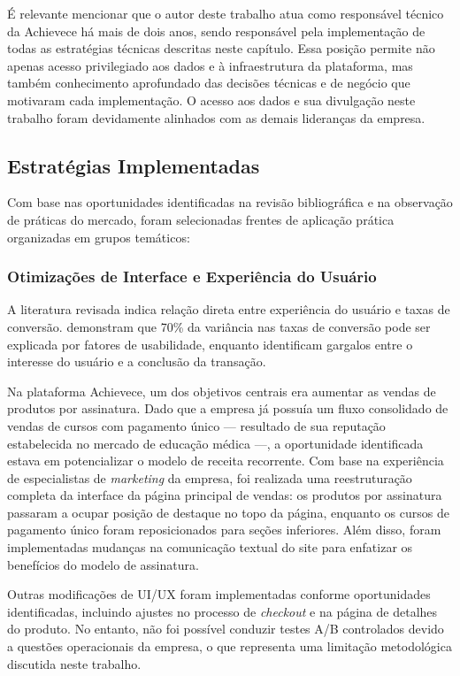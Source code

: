 É relevante mencionar que o autor deste trabalho atua como responsável técnico da Achievece há mais de dois anos, sendo responsável pela implementação de todas as estratégias técnicas descritas neste capítulo. Essa posição permite não apenas acesso privilegiado aos dados e à infraestrutura da plataforma, mas também conhecimento aprofundado das decisões técnicas e de negócio que motivaram cada implementação. O acesso aos dados e sua divulgação neste trabalho foram devidamente alinhados com as demais lideranças da empresa.

\subsection{Estratégias Implementadas}

Com base nas oportunidades identificadas na revisão bibliográfica e na observação de práticas do mercado, foram selecionadas frentes de aplicação prática organizadas em grupos temáticos:

\subsubsection{Otimizações de Interface e Experiência do Usuário}

A literatura revisada indica relação direta entre experiência do usuário e taxas de conversão. \cite{nawir_impact_2024} demonstram que 70\% da variância nas taxas de conversão pode ser explicada por fatores de usabilidade, enquanto \cite{muralidhar_clicks_2024} identificam gargalos entre o interesse do usuário e a conclusão da transação.

Na plataforma Achievece, um dos objetivos centrais era aumentar as vendas de produtos por assinatura. Dado que a empresa já possuía um fluxo consolidado de vendas de cursos com pagamento único --- resultado de sua reputação estabelecida no mercado de educação médica ---, a oportunidade identificada estava em potencializar o modelo de receita recorrente. Com base na experiência de especialistas de \textit{marketing} da empresa, foi realizada uma reestruturação completa da interface da página principal de vendas: os produtos por assinatura passaram a ocupar posição de destaque no topo da página, enquanto os cursos de pagamento único foram reposicionados para seções inferiores. Além disso, foram implementadas mudanças na comunicação textual do site para enfatizar os benefícios do modelo de assinatura.

Outras modificações de UI/UX foram implementadas conforme oportunidades identificadas, incluindo ajustes no processo de \textit{checkout} e na página de detalhes do produto. No entanto, não foi possível conduzir testes A/B controlados devido a questões operacionais da empresa, o que representa uma limitação metodológica discutida neste trabalho.


